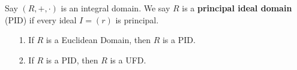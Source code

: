 \documentclass[12pt,letterpaper]{algebra_book}
\theoremstyle{definition}
\begin{document}
\begin{prf}
\begin{description}
    \end{description}
\end{prf}

\begin{definition}
    Say $(R, +, \cdot)$ is an integral domain. We say $R$ is a
    \textbf{principal ideal domain} (PID) if every ideal $I = (r)$
    is principal.
\end{definition}

\begin{proposition}
    \begin{itemize}
        \item[1.] If $R$ is a Euclidean Domain, then $R$ is a PID.
        \item[2.] If $R$ is a PID, then $R$ is a UFD. 
    \end{itemize}
\end{proposition}
\end{document}
